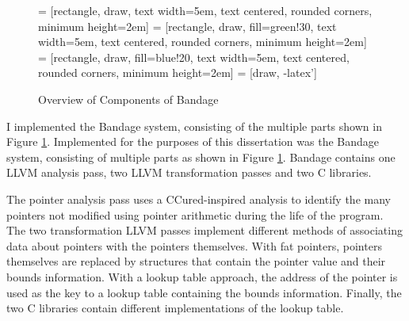 \documentclass[a4paper,12pt,twoside,openright]{report}
\begin{document}
\begin{figure}
\centering
{} = [rectangle, draw, 
text width=5em, text centered, rounded corners, minimum height=2em]
 = [rectangle, draw, fill=green!30, 
text width=5em, text centered, rounded corners, minimum height=2em]
 = [rectangle, draw, fill=blue!20, 
text width=5em, text centered, rounded corners, minimum height=2em]
 = [draw, -latex']
\caption{Overview of Components of Bandage}
\label{fig:Components}
\end{figure}

I implemented the Bandage system, consisting of the multiple parts shown in Figure \ref{fig:Components}.
Implemented for the purposes of this dissertation was the Bandage system, consisting of multiple parts as shown in Figure \ref{fig:Components}.
Bandage contains one LLVM analysis pass, two LLVM transformation passes and two C libraries.

The pointer analysis pass uses a CCured-inspired analysis to identify the many pointers not modified using pointer arithmetic during the life of the program.
The two transformation LLVM passes implement different methods of associating data about pointers with the pointers themselves.
With fat pointers, pointers themselves are replaced by structures that contain the pointer value and their bounds information.
With a lookup table approach, the address of the pointer is used as the key to a lookup table containing the bounds information.
Finally, the two C libraries contain different implementations of the lookup table.
\end{document}
